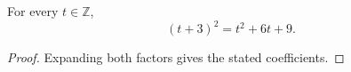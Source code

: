 \documentclass{article}
\begin{document}
\begin{theorem}\label{train:shift}
For every $t\in\mathbb{Z}$,
\[(t+3)^2=t^2+6t+9.\]
\end{theorem}
\begin{proof}Expanding both factors gives the stated coefficients.\end{proof}
\end{document}
